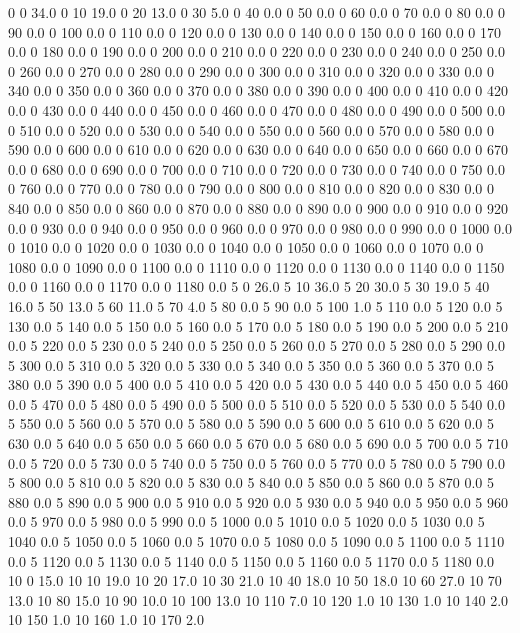 0	0	34.0
0	10	19.0
0	20	13.0
0	30	5.0
0	40	0.0
0	50	0.0
0	60	0.0
0	70	0.0
0	80	0.0
0	90	0.0
0	100	0.0
0	110	0.0
0	120	0.0
0	130	0.0
0	140	0.0
0	150	0.0
0	160	0.0
0	170	0.0
0	180	0.0
0	190	0.0
0	200	0.0
0	210	0.0
0	220	0.0
0	230	0.0
0	240	0.0
0	250	0.0
0	260	0.0
0	270	0.0
0	280	0.0
0	290	0.0
0	300	0.0
0	310	0.0
0	320	0.0
0	330	0.0
0	340	0.0
0	350	0.0
0	360	0.0
0	370	0.0
0	380	0.0
0	390	0.0
0	400	0.0
0	410	0.0
0	420	0.0
0	430	0.0
0	440	0.0
0	450	0.0
0	460	0.0
0	470	0.0
0	480	0.0
0	490	0.0
0	500	0.0
0	510	0.0
0	520	0.0
0	530	0.0
0	540	0.0
0	550	0.0
0	560	0.0
0	570	0.0
0	580	0.0
0	590	0.0
0	600	0.0
0	610	0.0
0	620	0.0
0	630	0.0
0	640	0.0
0	650	0.0
0	660	0.0
0	670	0.0
0	680	0.0
0	690	0.0
0	700	0.0
0	710	0.0
0	720	0.0
0	730	0.0
0	740	0.0
0	750	0.0
0	760	0.0
0	770	0.0
0	780	0.0
0	790	0.0
0	800	0.0
0	810	0.0
0	820	0.0
0	830	0.0
0	840	0.0
0	850	0.0
0	860	0.0
0	870	0.0
0	880	0.0
0	890	0.0
0	900	0.0
0	910	0.0
0	920	0.0
0	930	0.0
0	940	0.0
0	950	0.0
0	960	0.0
0	970	0.0
0	980	0.0
0	990	0.0
0	1000	0.0
0	1010	0.0
0	1020	0.0
0	1030	0.0
0	1040	0.0
0	1050	0.0
0	1060	0.0
0	1070	0.0
0	1080	0.0
0	1090	0.0
0	1100	0.0
0	1110	0.0
0	1120	0.0
0	1130	0.0
0	1140	0.0
0	1150	0.0
0	1160	0.0
0	1170	0.0
0	1180	0.0
5	0	26.0
5	10	36.0
5	20	30.0
5	30	19.0
5	40	16.0
5	50	13.0
5	60	11.0
5	70	4.0
5	80	0.0
5	90	0.0
5	100	1.0
5	110	0.0
5	120	0.0
5	130	0.0
5	140	0.0
5	150	0.0
5	160	0.0
5	170	0.0
5	180	0.0
5	190	0.0
5	200	0.0
5	210	0.0
5	220	0.0
5	230	0.0
5	240	0.0
5	250	0.0
5	260	0.0
5	270	0.0
5	280	0.0
5	290	0.0
5	300	0.0
5	310	0.0
5	320	0.0
5	330	0.0
5	340	0.0
5	350	0.0
5	360	0.0
5	370	0.0
5	380	0.0
5	390	0.0
5	400	0.0
5	410	0.0
5	420	0.0
5	430	0.0
5	440	0.0
5	450	0.0
5	460	0.0
5	470	0.0
5	480	0.0
5	490	0.0
5	500	0.0
5	510	0.0
5	520	0.0
5	530	0.0
5	540	0.0
5	550	0.0
5	560	0.0
5	570	0.0
5	580	0.0
5	590	0.0
5	600	0.0
5	610	0.0
5	620	0.0
5	630	0.0
5	640	0.0
5	650	0.0
5	660	0.0
5	670	0.0
5	680	0.0
5	690	0.0
5	700	0.0
5	710	0.0
5	720	0.0
5	730	0.0
5	740	0.0
5	750	0.0
5	760	0.0
5	770	0.0
5	780	0.0
5	790	0.0
5	800	0.0
5	810	0.0
5	820	0.0
5	830	0.0
5	840	0.0
5	850	0.0
5	860	0.0
5	870	0.0
5	880	0.0
5	890	0.0
5	900	0.0
5	910	0.0
5	920	0.0
5	930	0.0
5	940	0.0
5	950	0.0
5	960	0.0
5	970	0.0
5	980	0.0
5	990	0.0
5	1000	0.0
5	1010	0.0
5	1020	0.0
5	1030	0.0
5	1040	0.0
5	1050	0.0
5	1060	0.0
5	1070	0.0
5	1080	0.0
5	1090	0.0
5	1100	0.0
5	1110	0.0
5	1120	0.0
5	1130	0.0
5	1140	0.0
5	1150	0.0
5	1160	0.0
5	1170	0.0
5	1180	0.0
10	0	15.0
10	10	19.0
10	20	17.0
10	30	21.0
10	40	18.0
10	50	18.0
10	60	27.0
10	70	13.0
10	80	15.0
10	90	10.0
10	100	13.0
10	110	7.0
10	120	1.0
10	130	1.0
10	140	2.0
10	150	1.0
10	160	1.0
10	170	2.0
